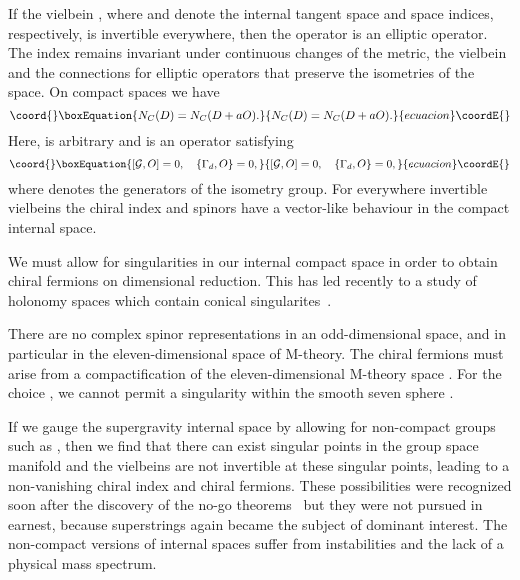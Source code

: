 \documentclass[a4paper,12pt]{article}
\begin{document}
If the vielbein \coordHE{}, where \coordHE{} and \myHighlight{$\Delta,\Sigma$}\coordHE{}
denote the internal tangent space and space indices,
respectively, is invertible everywhere, then the operator
\coordHE{} is an elliptic operator. The index \coordHE{}
remains invariant under continuous changes of the metric, the
vielbein and the connections for elliptic operators that
preserve the isometries of the space. On compact spaces we
have~\cite{Witten}
\begin{equation}\coord{}\boxEquation{
N_C(D)=N_C(D+aO).
}{
N_C(D)=N_C(D+aO).
}{ecuacion}\coordE{}\end{equation}
Here, \coordHE{} is arbitrary and \coordHE{} is an operator satisfying
\begin{equation}\coord{}\boxEquation{
[{\cal G},O]=0,\quad \{\Gamma_d,O\}=0,
}{
[{\cal G},O]=0,\quad \{\Gamma_d,O\}=0,
}{ecuacion}\coordE{}\end{equation}
where \coordHE{} denotes the generators of the isometry group. For
everywhere invertible vielbeins the chiral index \coordHE{} and
spinors have a vector-like behaviour in the compact internal
space.

We must allow for singularities in our internal compact space in order to
obtain chiral fermions on dimensional reduction. This has led recently to a
study of \coordHE{} holonomy spaces which contain conical
singularites~\cite{Acharya,Witten2,Witten3}.

There are no complex spinor representations in an odd-dimensional space, and in
particular in the eleven-dimensional space of M-theory. The chiral fermions must
arise from a compactification of the eleven-dimensional M-theory
space \coordHE{}. For the choice \coordHE{}, we
cannot permit a singularity within the smooth seven sphere \coordHE{}.

If we gauge the
supergravity internal space by allowing for non-compact groups such as
\coordHE{}, then we find that there can exist singular points in the group space
manifold and the vielbeins are not invertible at these singular points, leading to a
non-vanishing chiral index and chiral fermions. These possibilities were recognized
soon after the discovery of the no-go
theorems~\cite{Wetterich,Zwiebach,Moffat} but they were not pursued in
earnest, because superstrings again became the subject of dominant interest. The
non-compact versions of internal spaces suffer from instabilities and the lack of a
physical mass spectrum.
\end{document}
